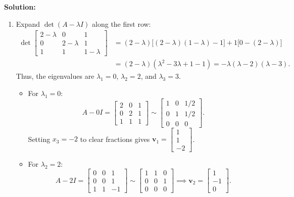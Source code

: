 \documentclass[11pt, letterpaper]{article}
\theoremstyle{definition}
\theoremstyle{remark}
\begin{document}
\textbf{Solution:}
\begin{enumerate}[label=(\alph*)]
    \item Expand $\det(A - \lambda I)$ along the first row:
    \begin{align*}
    \det\begin{bmatrix} 2 - \lambda & 0 & 1 \\ 0 & 2 - \lambda & 1 \\ 1 & 1 & 1 - \lambda \end{bmatrix}
    &= (2 - \lambda)\bigl[(2 - \lambda)(1 - \lambda) - 1\bigr] + 1\bigl[0 - (2 - \lambda)\bigr] \\
    &= (2 - \lambda)(\lambda^{2} - 3\lambda + 1 - 1) = -\lambda(\lambda - 2)(\lambda - 3).
    \end{align*}
    Thus, the eigenvalues are $\lambda_{1} = 0$, $\lambda_{2} = 2$, and $\lambda_{3} = 3$.
    \begin{itemize}
        \item For $\lambda_{1} = 0$:
        \[
        A - 0I = \begin{bmatrix} 2 & 0 & 1 \\ 0 & 2 & 1 \\ 1 & 1 & 1 \end{bmatrix} \sim \begin{bmatrix} 1 & 0 & 1/2 \\ 0 & 1 & 1/2 \\ 0 & 0 & 0 \end{bmatrix}.
        \]
        Setting $x_{3} = -2$ to clear fractions gives $\mathbf{v}_{1} = \begin{bmatrix} 1 \\ 1 \\ -2 \end{bmatrix}$.
        \item For $\lambda_{2} = 2$:
        \[
        A - 2I = \begin{bmatrix} 0 & 0 & 1 \\ 0 & 0 & 1 \\ 1 & 1 & -1 \end{bmatrix} \sim \begin{bmatrix} 1 & 1 & 0 \\ 0 & 0 & 1 \\ 0 & 0 & 0 \end{bmatrix} \implies \mathbf{v}_{2} = \begin{bmatrix} 1 \\ -1 \\ 0 \end{bmatrix}.
\]
\end{itemize}
\end{enumerate}
\end{document}
